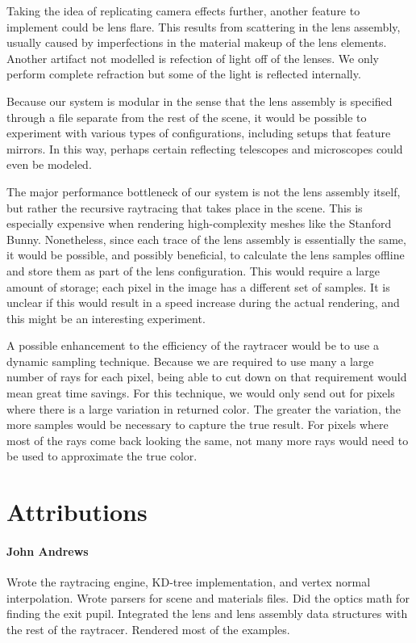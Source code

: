 \documentclass[twocolumn]{article}
\begin{document}
Taking the idea of replicating camera effects further, another feature to implement could
be lens flare. This results from scattering in the lens assembly, usually caused by
imperfections in the material makeup of the lens elements. Another artifact not modelled is
refection of light off of the lenses. We only perform complete refraction but some of the
light is reflected internally.

Because our system is modular in the sense that the lens assembly is specified through a
file separate from the rest of the scene, it would be possible to experiment with various
types of configurations, including setups that feature mirrors. In this way, perhaps
certain reflecting telescopes and microscopes could even be modeled.

The major performance bottleneck of our system is not the lens assembly itself, but
rather the recursive raytracing that takes place in the scene. This is especially
expensive when rendering high-complexity meshes like the Stanford Bunny. Nonetheless,
since each trace of the lens assembly is essentially the same, it would be
possible, and possibly beneficial, to calculate the lens samples offline and store
them as part of the lens configuration. This would require a large amount of storage;
each pixel in the image has a different set of samples. It is unclear if this would
result in a speed increase during the actual rendering, and this might be an interesting
experiment.

A possible enhancement to the efficiency of the raytracer would be to use a dynamic
sampling technique. Because we are required to use many a large number of rays for
each pixel, being able to cut down on that requirement would mean great time savings.
For this technique, we would only send out for pixels where there is a large variation
in returned color. The greater the variation, the more samples would be necessary to
capture the true result. For pixels where most of the rays come back looking the same,
not many more rays would need to be used to approximate the true color.

\section{Attributions}
\paragraph{John Andrews}
Wrote the raytracing engine, KD-tree implementation, and vertex normal interpolation.
Wrote parsers for scene and materials files. Did the optics math for finding
the exit pupil. Integrated the lens and lens assembly data structures with the rest
of the raytracer. Rendered most of the examples.
\end{document}
